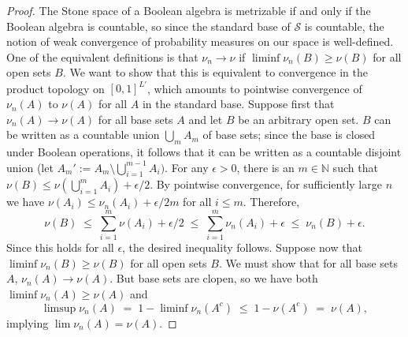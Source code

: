 \documentclass[12pt]{article}
\newcommand{\cS}{\mathcal{S}}
\theoremstyle{plain}
\theoremstyle{definition}
\theoremstyle{remark}
\begin{document}
\begin{proof}
The Stone space of a Boolean algebra is metrizable if and only if the Boolean algebra is countable, so since the standard base of $\cS$ is countable, the notion of weak convergence of probability measures on our space is well-defined. One of the equivalent definitions is that $\nu_n\to\nu$ if $\liminf\nu_n(B)\ge\nu(B)$ for all open sets $B$. We want to show that this is equivalent to convergence in the product topology on $[0,1]^{L'}$, which amounts to pointwise convergence of $\nu_n(A)$ to $\nu(A)$ for all $A$ in the standard base.
Suppose first that $\nu_n(A)\to\nu(A)$ for all base sets $A$ and let $B$ be an arbitrary open set. $B$ can be written as a countable union $\textstyle\bigcup_m A_m$ of base sets; since the base is closed under Boolean operations, it follows that it can be written as a countable disjoint union (let $\textstyle A_m' := A_m\setminus\bigcup_{i=1}^{m-1}A_i)$. For any $\epsilon>0$, there is an $m\in\mathbb{N}$ such that $\textstyle\nu(B)\le\nu(\bigcup_{i=1}^m A_i)+\epsilon/2$. By pointwise convergence, for sufficiently large $n$ we have $\nu(A_i)\le\nu_n(A_i) + \epsilon/2m$ for all $i\le m$. Therefore,
\[
\textstyle\nu(B)\;\le\;\sum_{i=1}^m\nu(A_i)+\epsilon/2\;\le\;\sum_{i=1}^m\nu_n(A_i) + \epsilon\;\le\;\nu_n(B)+\epsilon.
\]
Since this holds for all $\epsilon$, the desired inequality follows.
Suppose now that $\liminf\nu_n(B)\ge\nu(B)$ for all open sets $B$. We must show that for all base sets $A$, $\nu_n(A)\to\nu(A)$. But base sets are clopen, so we have both $\liminf\nu_n(A)\ge\nu(A)$ and
\[
\limsup\nu_n(A) \;=\; 1-\liminf\nu_n(A^c) \;\le\; 1 - \nu(A^c) \;=\; \nu(A),
\]
implying $\lim\nu_n(A) = \nu(A)$.
\end{proof}
\end{document}
